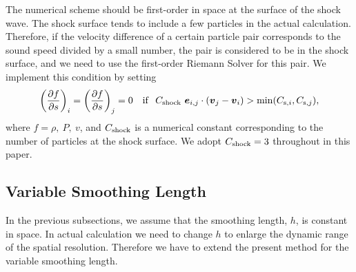\documentclass{cjour}
\newcommand{ \Vec   }[1]{ \mbox{\boldmath $ #1 $} }
\newcommand{ \PD    }[2]{ \frac{ \partial #1 }{ \partial #2 } }
\begin{document}
\begin{article}
The numerical scheme should be first-order in space at the surface 
of the shock wave. 
The shock surface tends to include a few particles in the 
actual calculation. 
Therefore, 
if the velocity difference of a certain particle pair corresponds to 
the sound speed divided by a small number, 
the pair is considered to be in the shock surface, 
and we need to use the first-order Riemann Solver for 
this pair.  
We implement this condition by setting 
\begin{equation}
                  \left( \PD{f}{s} \right)_i = 
                  \left( \PD{f}{s} \right)_j = 0
                  ~~~
                  {\rm if}
                  ~~
                  C_{\rm shock}~\Vec{e}_{i,j} \cdot 
                                ( \Vec{v}_j - \Vec{v}_i ) 
                  > \min(C_{{\rm s},i},C_{{\rm s},j}),  
\end{equation}
where $f=\rho,~P,~v$, 
and $C_{\rm shock}$ is a numerical constant corresponding to 
the number of particles at the shock surface.   
We adopt $C_{\rm shock}=3$ throughout in this paper. 



\subsection{Variable Smoothing Length}
                                                   \label{Sec:vh}
In the previous subsections, we assume that 
the smoothing length, $h$, is constant in space.  
In actual calculation we need to change $h$ to enlarge the dynamic 
range of the spatial resolution. 
Therefore we have to extend the present method for the variable 
smoothing length. 


\end{article}
\end{document}
